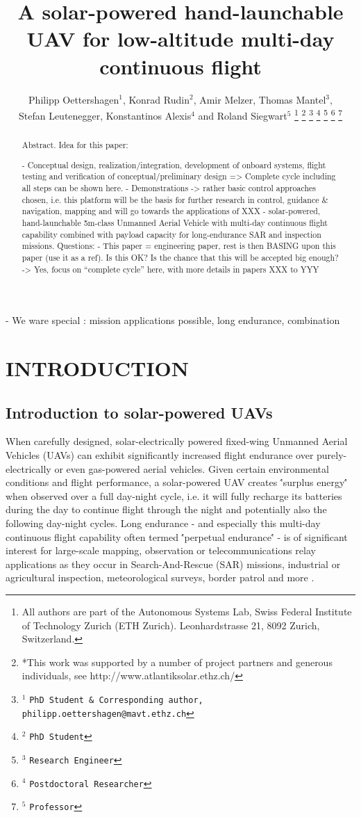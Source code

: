 \documentclass[letterpaper, 10 pt, conference]{ieeeconf}  %
\title{\LARGE \bf A solar-powered hand-launchable UAV for low-altitude multi-day continuous flight}
\author{Philipp Oettershagen$^{1}$, Konrad Rudin$^{2}$, Amir Melzer, Thomas Mantel$^{3}$, \\ Stefan Leutenegger, Konstantinos Alexis$^{4}$ and Roland Siegwart$^{5}$%
\thanks{All authors are part of the Autonomous Systems Lab, Swiss Federal Institute of Technology Zurich (ETH Zurich). Leonhardstrasse 21, 8092 Zurich, Switzerland. }
\thanks{*This work was supported by a number of project partners and generous individuals, see http://www.atlantiksolar.ethz.ch/  }%
\thanks{$^{1}$ {\tt\small PhD Student \& Corresponding author, philipp.oettershagen@mavt.ethz.ch}}%
\thanks{$^{2}$ {\tt\small PhD Student}}%
\thanks{$^{3}$ {\tt\small Research Engineer}}%
\thanks{$^{4}$ {\tt\small Postdoctoral Researcher}}%
\thanks{$^{5}$ {\tt\small Professor}}%
 }
\begin{document}
\maketitle
\thispagestyle{empty}
\pagestyle{empty}

\begin{abstract}

Abstract. Idea for this paper:

 - Conceptual design, realization/integration, development of onboard systems, flight testing and verification of conceptual/preliminary design => Complete cycle including all steps can be shown here.
   - Demonstrations -> rather basic control approaches chosen, i.e. this platform will be the basis for further research in control, guidance \& navigation, mapping and will go towards the applications of XXX
    - solar-powered, hand-launchable 5m-class Unmanned Aerial Vehicle with multi-day continuous flight capability combined with payload capacity for long-endurance SAR and inspection missions.
Questions:
      - This paper = engineering paper, rest is then BASING upon this paper (use it as a ref). Is this OK? Is the chance that this will be accepted big enough? -> Yes, focus on ``complete cycle'' here, with more details in papers XXX to YYY

\end{abstract}



 - We ware special : mission applications possible, long endurance, combination
\section{INTRODUCTION}

 \subsection{Introduction to solar-powered UAVs}
 When carefully designed, solar-electrically powered fixed-wing Unmanned Aerial Vehicles (UAVs) can exhibit significantly increased flight endurance over purely-electrically or even gas-powered aerial vehicles. Given certain environmental conditions and flight performance, a solar-powered UAV creates \''surplus energy\'' when observed over a full day-night cycle, i.e. it will fully recharge its batteries during the day to continue flight through the night and potentially also the following day-night cycles. Long endurance - and especially this multi-day continuous flight capability often termed \''perpetual endurance\'' - is of significant interest for large-scale mapping, observation or telecommunications relay applications as they occur in Search-And-Rescue (SAR) missions, industrial or agricultural inspection, meteorological surveys, border patrol and more \cite{NASA_Pathfinder}.
 
\end{document}
